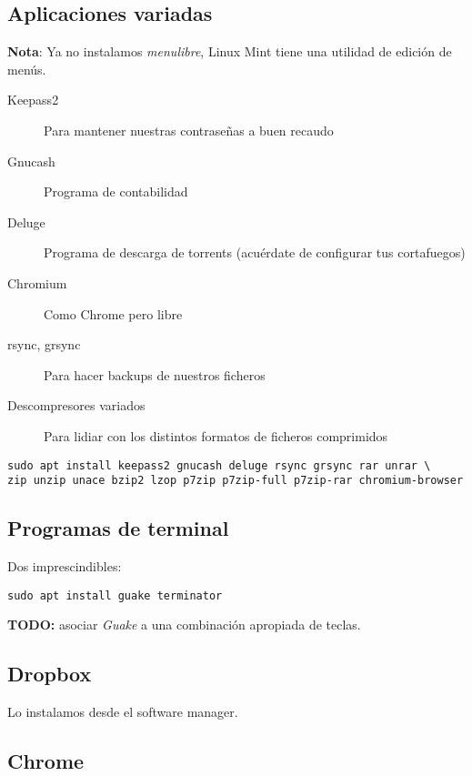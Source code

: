 \documentclass[
  12pt,
  spanish,
]{article}
\begin{document}
\hypertarget{aplicaciones-variadas}{%
\subsection{Aplicaciones variadas}\label{aplicaciones-variadas}}

\textbf{Nota}: Ya no instalamos \emph{menulibre}, Linux Mint tiene una
utilidad de edición de menús.

\begin{description}
\item[Keepass2]
Para mantener nuestras contraseñas a buen recaudo
\item[Gnucash]
Programa de contabilidad
\item[Deluge]
Programa de descarga de torrents (acuérdate de configurar tus
cortafuegos)
\item[Chromium]
Como Chrome pero libre
\item[rsync, grsync]
Para hacer backups de nuestros ficheros
\item[Descompresores variados]
Para lidiar con los distintos formatos de ficheros comprimidos
\end{description}

\begin{verbatim}
sudo apt install keepass2 gnucash deluge rsync grsync rar unrar \
zip unzip unace bzip2 lzop p7zip p7zip-full p7zip-rar chromium-browser
\end{verbatim}

\hypertarget{programas-de-terminal}{%
\subsection{Programas de terminal}\label{programas-de-terminal}}

Dos imprescindibles:

\begin{verbatim}
sudo apt install guake terminator
\end{verbatim}

\textbf{TODO:} asociar \emph{Guake} a una combinación apropiada de
teclas.

\hypertarget{dropbox}{%
\subsection{Dropbox}\label{dropbox}}

Lo instalamos desde el software manager.

\hypertarget{chrome}{%
\subsection{Chrome}\label{chrome}}
\end{document}
